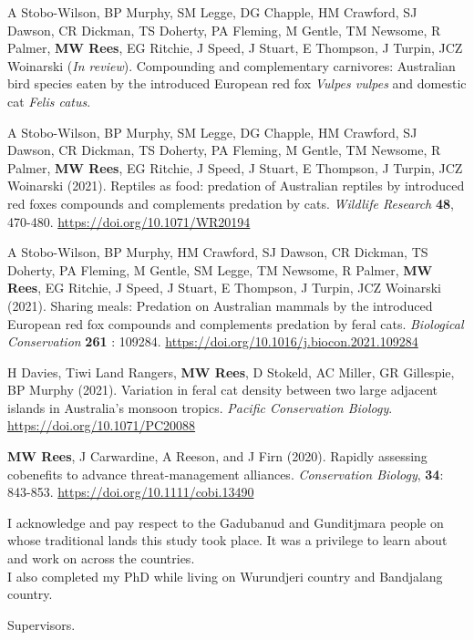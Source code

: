 \documentclass[11pt,a4paper,titlepage,twoside,openright]{style/unimelbthesis}
\begin{document}
\begin{frontmatter}
\begin{preface}
    A Stobo-Wilson, BP Murphy, SM Legge, DG Chapple, HM Crawford, SJ Dawson, CR Dickman, TS Doherty, PA Fleming, M Gentle, TM Newsome, R Palmer, \textbf{MW Rees}, EG Ritchie, J Speed, J Stuart, E Thompson, J Turpin, JCZ Woinarski (\emph{In review}). Compounding and complementary carnivores: Australian bird species eaten by the introduced European red fox \emph{Vulpes vulpes} and domestic cat \emph{Felis catus}.
    
    A Stobo-Wilson, BP Murphy, SM Legge, DG Chapple, HM Crawford, SJ Dawson, CR Dickman, TS Doherty, PA Fleming, M Gentle, TM Newsome, R Palmer, \textbf{MW Rees}, EG Ritchie, J Speed, J Stuart, E Thompson, J Turpin, JCZ Woinarski (2021). Reptiles as food: predation of Australian reptiles by introduced red foxes compounds and complements predation by cats. \emph{Wildlife Research} \textbf{48}, 470-480. \url{https://doi.org/10.1071/WR20194}
    
    A Stobo-Wilson, BP Murphy, HM Crawford, SJ Dawson, CR Dickman, TS Doherty, PA Fleming, M Gentle, SM Legge, TM Newsome, R Palmer, \textbf{MW Rees}, EG Ritchie, J Speed, J Stuart, E Thompson, J Turpin, JCZ Woinarski (2021). Sharing meals: Predation on Australian mammals by the introduced European red fox compounds and complements predation by feral cats. \emph{Biological Conservation} \textbf{261} : 109284. \url{https://doi.org/10.1016/j.biocon.2021.109284}
    
    H Davies, Tiwi Land Rangers, \textbf{MW Rees}, D Stokeld, AC Miller, GR Gillespie, BP Murphy (2021). Variation in feral cat density between two large adjacent islands in Australia's monsoon tropics. \emph{Pacific Conservation Biology}. \url{https://doi.org/10.1071/PC20088}
    
    \textbf{MW Rees}, J Carwardine, A Reeson, and J Firn (2020). Rapidly assessing cobenefits to advance threat-management alliances. \emph{Conservation Biology}, \textbf{34}: 843-853. \url{https://doi.org/10.1111/cobi.13490}
  \end{preface}
  \begin{acknowledgements}
    I acknowledge and pay respect to the Gadubanud and Gunditjmara people on whose traditional lands this study took place. It was a privilege to learn about and work on across the countries.\\
    I also completed my PhD while living on Wurundjeri country and Bandjalang country.
    
    Supervisors.
    

\end{acknowledgements}
\end{frontmatter}
\end{document}
